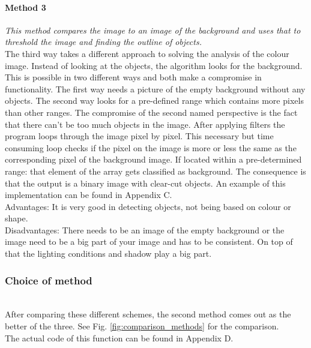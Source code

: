 \documentclass{article}
\begin{document}
\paragraph{Method 3}
\textit{This method compares the image to an image of the background and uses that to threshold the image and finding the outline of objects.}\\
The third way takes a different approach to solving the analysis of the colour image. Instead of looking at the objects, the algorithm looks for the background. This is possible in two different ways and both make a compromise in functionality. The first way needs a picture of the empty background without any objects. The second way looks for a pre-defined range which contains more pixels than other ranges. The compromise of the second named perspective is the fact that there can't be too much objects in the image. After applying filters the program loops through the image pixel by pixel. This necessary but time consuming loop checks if the pixel on the image is more or less the same as the corresponding pixel of the background image. If located within a pre-determined range: that element of the array gets classified as background. The consequence is that the output is a binary image with clear-cut objects. An example of this implementation can be found in Appendix C. 
\\Advantages: It is very good in detecting objects, not being based on colour or shape.
\\Disadvantages: There needs to be an image of the empty background or the image need to be a big part of your image and has to be consistent. On top of that the lighting conditions and shadow play a big part. 
\subsubsection{Choice of method}\mbox{}\\
After comparing these different schemes, the second method comes out as the better of the three. See Fig. \ref{fig:comparison_methods} for the comparison.\\ The actual code of this function can be found in Appendix D. 
\end{document}
